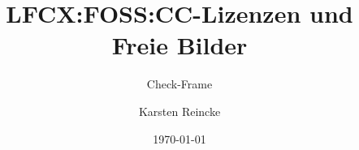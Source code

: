 \documentclass[]{beamer}
\title{LFCX:FOSS:CC-Lizenzen und Freie Bilder}
\subtitle{Check-Frame}
\institute[GS-LDK]{Gewerbliche Schulen Dillenburg}
\author{Karsten Reincke}
\date{\today}
\def\cfgGl{../../../../cfg.gl/}
\begin{document}

\begin{frame}
  \titlepage

  

  
\end{frame}






\logo{}
\newpage



%
\end{document}
